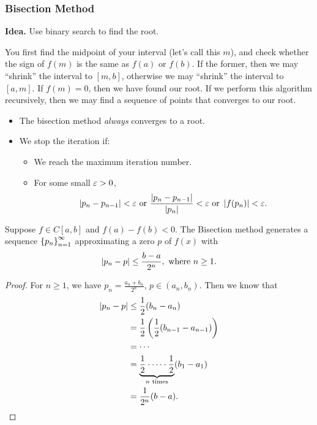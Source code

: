 \documentclass[class=article, crop=false]{standalone}
\begin{document}
  \subsubsection{Bisection Method}
  \textbf{Idea.} Use binary search to find the root. \par
  You first find the midpoint of your interval (let's call this $m$), and check whether the sign of $f(m)$ is the same as $f(a)$ or $f(b)$. If the former, then we may ``shrink'' the interval to $[m, b]$, otherwise we may ``shrink'' the interval to $[a, m]$. If $f(m) = 0$, then we have found our root. If we perform this algorithm recursively, then we may find a sequence of points that converges to our root.
  \begin{note}{}
    \begin{itemize}
      \item The bisection method \emph{always} converges to a root.
      \item We stop the iteration if:
      \begin{itemize}
        \item We reach the maximum iteration number.
        \item For some small $\varepsilon > 0$,
        \[
          \left\lvert p_n - p_{n - 1} \right\rvert < \varepsilon \text{ or } \frac{\left\lvert p_n - p_{n - 1} \right\rvert}{\left\lvert p_n \right\rvert} < \varepsilon \text{ or } \left\lvert f(p_n) \right\rvert < \varepsilon.
        \]
      \end{itemize}
    \end{itemize}
  \end{note}
  \begin{theorem}{}
    Suppose $f\in C[a, b]$ and $f(a) - f(b) < 0$. The Bisection method generates a sequence $\left\{p_n\right\}_{n = 1}^\infty$ approximating a zero $p$ of $f(x)$ with
    \[
      \left\lvert p_n - p \right\rvert\leq \frac{b- a}{2^n}, \text{ where }n\geq 1.
    \]
    \begin{proof}
      For $n\geq 1$, we have $p_n = \frac{a_n + b_n}{2^n}$, $p\in (a_n, b_n)$. Then we know that 
      \begin{align*}
        \left\lvert p_n - p \right\rvert&\leq \frac{1}{2}(b_n - a_n) \\
                     &= \frac{1}{2}\left( \frac{1}{2}(b_{n - 1} - a_{n - 1}) \right) \\
                     &= \dotsb \\
                     &= \underbrace{\frac{1}{2}\cdot \dotsb\cdot \frac{1}{2}}_{n \text{ times}}(b_1 - a_1) \\
                     &= \frac{1}{2^n}(b - a).
      \end{align*}
    \end{proof}
  \end{theorem}
\end{document}
